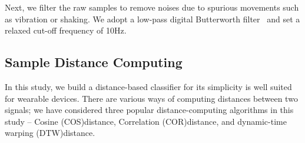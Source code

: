 Next, we filter the raw samples to remove noises due to spurious movements such as vibration or shaking.
We adopt a low-pass digital Butterworth
filter~\cite{challis1983design} and set a relaxed cut-off frequency of 10Hz.


\subsection{Sample Distance Computing}\label{subsec:distance}


In this study, we build a distance-based classifier for its simplicity is well suited for wearable devices. There are various ways of computing distances between two signals; we have considered three popular distance-computing algorithms in this study -- Cosine (COS)distance, Correlation (COR)distance, and dynamic-time warping (DTW)distance.

